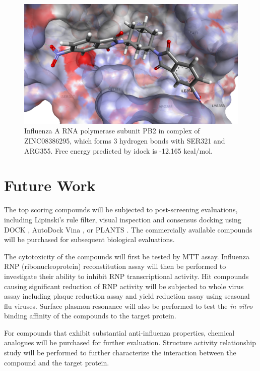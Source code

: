 \begin{figure}
\centering
\includegraphics[width=\linewidth]{../influenza/2VQZ-ZINC08386295.png}
\caption{Influenza A RNA polymerase subunit PB2 in complex of ZINC08386295, which forms 3 hydrogen bonds with SER321 and ARG355. Free energy predicted by idock is -12.165 kcal/mol.}
\label{influenza:2VQZ-ZINC08386295}
\end{figure}

\section{Future Work}

The top scoring compounds will be subjected to post-screening evaluations, including Lipinski’s rule filter, visual inspection and consensus docking using DOCK \citep{1222}, AutoDock Vina \citep{595}, or PLANTS \citep{610,607,779}. The commercially available compounds will be purchased for subsequent biological evaluations.

The cytotoxicity of the compounds will first be tested by MTT assay. Influenza RNP (ribonucleoprotein) reconstitution assay will then be performed to investigate their ability to inhibit RNP transcriptional activity. Hit compounds causing significant reduction of RNP activity will be subjected to whole virus assay including plaque reduction assay and yield reduction assay using seasonal flu viruses. Surface plasmon resonance will also be performed to test the \textit{in vitro} binding affinity of the compounds to the target protein. 

For compounds that exhibit substantial anti-influenza properties, chemical analogues will be purchased for further evaluation. Structure activity relationship study will be performed to further characterize the interaction between the compound and the target protein.

\chapterend
